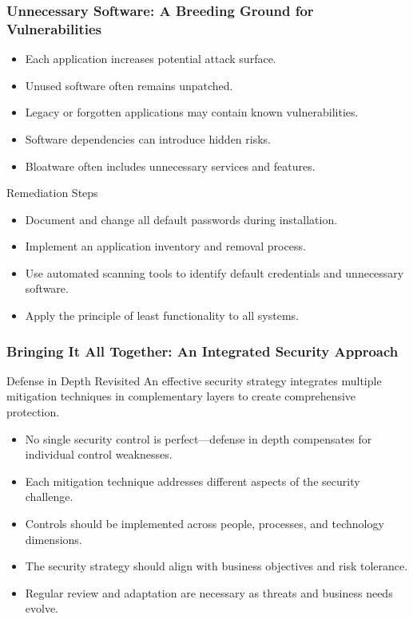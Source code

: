 \documentclass{beamer}
\begin{document}
\begin{frame}
    \frametitle{Unnecessary Software: A Breeding Ground for Vulnerabilities}
    \begin{itemize}
    \item Each application increases potential attack surface.
    \item Unused software often remains unpatched.
    \item Legacy or forgotten applications may contain known vulnerabilities.
    \item Software dependencies can introduce hidden risks.
    \item Bloatware often includes unnecessary services and features.
    \end{itemize}
    
    \begin{alertblock}{Remediation Steps}
    \begin{itemize}
    \item Document and change all default passwords during installation.
    \item Implement an application inventory and removal process.
    \item Use automated scanning tools to identify default credentials and unnecessary software.
    \item Apply the principle of least functionality to all systems.
    \end{itemize}
    \end{alertblock}
    \end{frame}
    
    \begin{frame}
    \frametitle{Bringing It All Together: An Integrated Security Approach}
    
    \begin{block}{Defense in Depth Revisited}
    An effective security strategy integrates multiple mitigation techniques in complementary layers to create comprehensive protection.
    \end{block}
    
    \begin{itemize}
    \item No single security control is perfect—defense in depth compensates for individual control weaknesses.
    \item Each mitigation technique addresses different aspects of the security challenge.
    \item Controls should be implemented across people, processes, and technology dimensions.
    \item The security strategy should align with business objectives and risk tolerance.
    \item Regular review and adaptation are necessary as threats and business needs evolve.
    \end{itemize}
    
    \end{frame}
\end{document}
